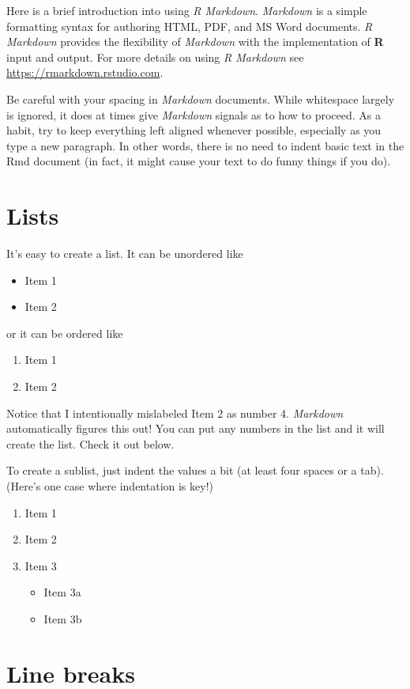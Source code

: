 \documentclass[12pt,twoside]{reedthesis}
\providecommand{\tightlist}{%
  \setlength{\itemsep}{0pt}\setlength{\parskip}{0pt}}
\begin{document}
Here is a brief introduction into using \emph{R Markdown}. \emph{Markdown} is a simple formatting syntax for authoring HTML, PDF, and MS Word documents. \emph{R Markdown} provides the flexibility of \emph{Markdown} with the implementation of \textbf{R} input and output. For more details on using \emph{R Markdown} see \url{https://rmarkdown.rstudio.com}.

Be careful with your spacing in \emph{Markdown} documents. While whitespace largely is ignored, it does at times give \emph{Markdown} signals as to how to proceed. As a habit, try to keep everything left aligned whenever possible, especially as you type a new paragraph. In other words, there is no need to indent basic text in the Rmd document (in fact, it might cause your text to do funny things if you do).

\hypertarget{lists}{%
\section{Lists}\label{lists}}

It's easy to create a list. It can be unordered like
\begin{itemize}
\tightlist
\item
  Item 1
\item
  Item 2
\end{itemize}
or it can be ordered like
\begin{enumerate}
\def\labelenumi{\arabic{enumi}.}
\tightlist
\item
  Item 1
\item
  Item 2
\end{enumerate}
Notice that I intentionally mislabeled Item 2 as number 4. \emph{Markdown} automatically figures this out! You can put any numbers in the list and it will create the list. Check it out below.

To create a sublist, just indent the values a bit (at least four spaces or a tab). (Here's one case where indentation is key!)
\begin{enumerate}
\def\labelenumi{\arabic{enumi}.}
\tightlist
\item
  Item 1
\item
  Item 2
\item
  Item 3
  \begin{itemize}
  \tightlist
  \item
    Item 3a
  \item
    Item 3b
  \end{itemize}
\end{enumerate}
\hypertarget{line-breaks}{%
\section{Line breaks}\label{line-breaks}}
\end{document}
